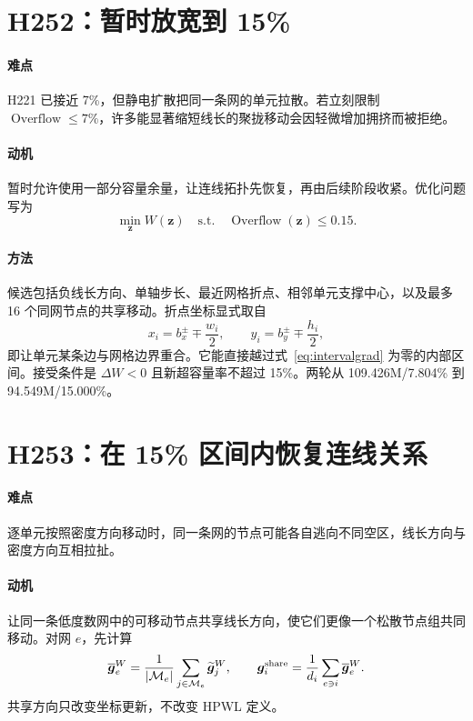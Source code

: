 \documentclass[UTF8,a4paper,11pt]{ctexrep}
\newcommand{\Overflow}{\operatorname{Overflow}}
\newcommand{\Mcal}{\mathcal{M}}
\begin{document}
\section{H252：暂时放宽到 15\%}
\paragraph{难点}
H221 已接近 7\%，但静电扩散把同一条网的单元拉散。若立刻限制 $\Overflow\le7\%$，许多能显著缩短线长的聚拢移动会因轻微增加拥挤而被拒绝。

\paragraph{动机}
暂时允许使用一部分容量余量，让连线拓扑先恢复，再由后续阶段收紧。优化问题写为
\begin{equation}
 \min_{\bm z} W(\bm z)\quad\text{s.t.}\quad \Overflow(\bm z)\le0.15. \label{eq:cap15}
\end{equation}

\paragraph{方法}
候选包括负线长方向、单轴步长、最近网格折点、相邻单元支撑中心，以及最多 16 个同网节点的共享移动。折点坐标显式取自
\begin{equation}
 x_i=b_x^\pm\mp\frac{w_i}{2},\qquad
 y_i=b_y^\pm\mp\frac{h_i}{2}, \label{eq:breakpoints}
\end{equation}
即让单元某条边与网格边界重合。它能直接越过式~\eqref{eq:intervalgrad} 为零的内部区间。接受条件是 $\Delta W<0$ 且新超容量率不超过 15\%。两轮从 109.426M/7.804\% 到 94.549M/15.000\%。

\section{H253：在 15\% 区间内恢复连线关系}
\paragraph{难点}
逐单元按照密度方向移动时，同一条网的节点可能各自逃向不同空区，线长方向与密度方向互相拉扯。

\paragraph{动机}
让同一条低度数网中的可移动节点共享线长方向，使它们更像一个松散节点组共同移动。对网 $e$，先计算
\begin{equation}
 \overline{\bm g}_e^W=\frac{1}{|\Mcal_e|}\sum_{j\in\Mcal_e}\widetilde{\bm g}_j^W,
 \qquad
 \bm g_i^{\rm share}=\frac{1}{d_i}\sum_{e\ni i}\overline{\bm g}_e^W. \label{eq:sharedgrad}
\end{equation}
共享方向只改变坐标更新，不改变 HPWL 定义。
\end{document}
